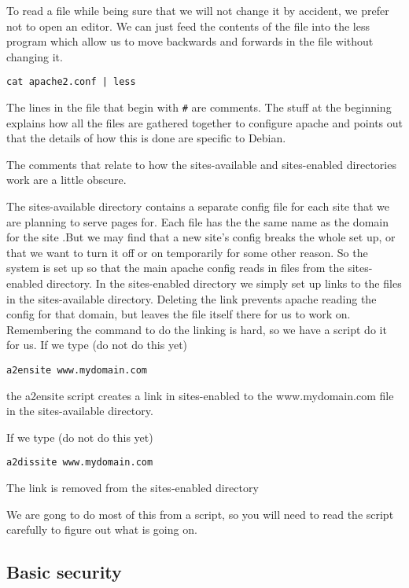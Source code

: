 \documentclass[12pt, a4paper]{article}
\begin{document}
To read a file while being sure that we will not change it by accident, we prefer not to open an editor. We can just feed the contents of the file into the less program which allow us to move backwards and forwards in the file without changing it.

\begin{verbatim}
cat apache2.conf | less
\end{verbatim}
The lines in the file that begin with \verb|#| are comments. The stuff at the beginning explains how all the files are gathered together to configure apache and points out that the details of how this is done are specific to Debian.

The comments that relate to how the sites-available and sites-enabled directories work are a little obscure.

The sites-available directory contains a separate config file for each site that we are planning to serve pages for. Each file has the the same name as the domain for the site .But we may find that a new site’s config breaks the whole set up, or that we want to turn it off or on temporarily for some other reason. So the system is set up so that the main apache config reads in files from the sites-enabled directory. In the sites-enabled directory we simply set up links to the files in the sites-available directory. Deleting the link prevents apache reading the config for that domain, but leaves the file itself there for us to work on. Remembering the command to do the linking is hard, so we have a script do it for us. If we type (do not do this yet)
\begin{verbatim}
a2ensite www.mydomain.com
\end{verbatim}

the a2ensite script creates a link in sites-enabled to the www.mydomain.com file in the sites-available directory.

If we type  (do not do this yet)

\begin{verbatim}
a2dissite www.mydomain.com
\end{verbatim}

The link is removed from the sites-enabled directory

We are gong to do most of this from a script, so you will need to read the script carefully to figure out what is going on.

\subsection*{Basic security}
\end{document}
